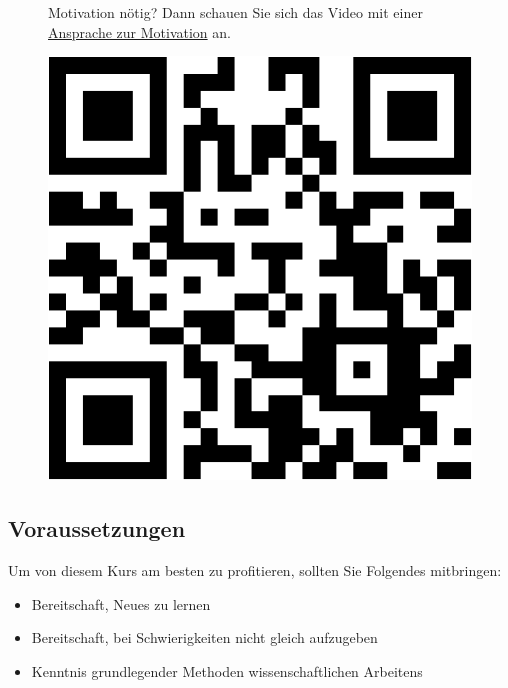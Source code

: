 \documentclass[
  letterpaper,
  oneside,
  open=any]{scrbook}
\providecommand{\tightlist}{%
  \setlength{\itemsep}{0pt}\setlength{\parskip}{0pt}}\usepackage{longtable,booktabs,array}
\theoremstyle{definition}
\theoremstyle{definition}
\theoremstyle{definition}
\theoremstyle{remark}
\begin{document}
\begin{figure}

\begin{minipage}{0.80\linewidth}
Motivation nötig? Dann schauen Sie sich das Video mit einer
\href{https://youtu.be/jtNlzpcPr5Y}{Ansprache zur Motivation}
an.\end{minipage}%
%
\begin{minipage}{0.20\linewidth}

\begin{center}
\includegraphics[width=0.75\linewidth,height=\textheight,keepaspectratio]{005-orga_files/figure-pdf/unnamed-chunk-2-1.pdf}
\end{center}

\end{minipage}%

\end{figure}%

\subsection{Voraussetzungen}\label{voraussetzungen}

Um von diesem Kurs am besten zu profitieren, sollten Sie Folgendes
mitbringen:

\begin{itemize}
\tightlist
\item
  Bereitschaft, Neues zu lernen
\item
  Bereitschaft, bei Schwierigkeiten nicht gleich aufzugeben
\item
  Kenntnis grundlegender Methoden wissenschaftlichen Arbeitens
\end{itemize}
\end{document}
